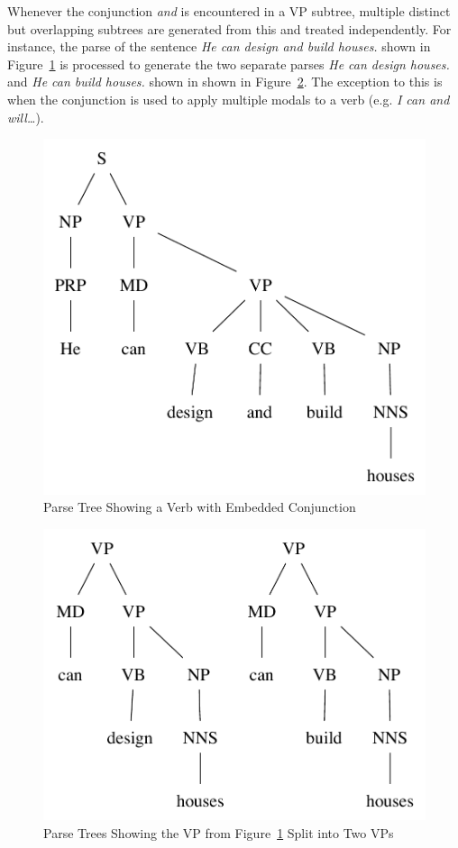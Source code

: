 \documentclass[main.tex]{subfiles}
\begin{document}
Whenever the conjunction \textit{and} is encountered in a VP subtree, multiple distinct but overlapping subtrees are generated from this and treated independently. For instance, the parse of the sentence \textit{He can design and build houses.} shown in Figure~\ref{fig:conj-verb} is processed to generate the two separate parses \textit{He can design houses.} and \textit{He can build houses.} shown in shown in Figure~\ref{fig:conj-verb-ab}. The exception to this is when the conjunction is used to apply multiple modals to a verb (e.g. \textit{I can and will\ldots}).
\begin{figure}[htbp]
\centering
\includegraphics[scale=0.6]{conj-verb.pdf}
\caption{Parse Tree Showing a Verb with Embedded Conjunction}
\label{fig:conj-verb}
\end{figure}

\begin{figure}[htbp]
\centering
\includegraphics[scale=0.6]{conj-verb-ab.pdf}
\caption{Parse Trees Showing the VP from Figure~\ref{fig:conj-verb} Split into Two VPs}
\label{fig:conj-verb-ab}
\end{figure}
\end{document}
